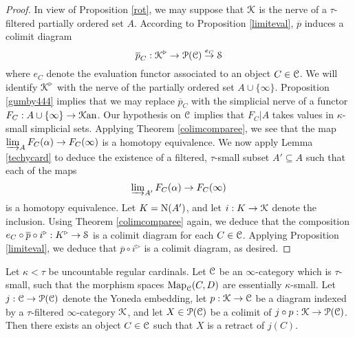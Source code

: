 \begin{proof}
In view of Proposition \ref{rot}, we may suppose that $\operatorname{\mathcal{K}}$ is the nerve of a $\tau$-filtered partially ordered set $A$. According to Proposition \ref{limiteval}, $\overline{p}$ induces a colimit diagram
$$ \overline{p}_{C}: \operatorname{\mathcal{K}}^{\triangleright} \rightarrow \operatorname{\mathcal{P}}(\operatorname{\mathcal{C}}) \stackrel{e_C}{\rightarrow} \operatorname{\mathcal{S}}$$
where $e_{C}$ denote the evaluation functor associated to an object $C \in \operatorname{\mathcal{C}}$. We will
identify $\operatorname{\mathcal{K}}^{\triangleright}$ with the nerve of the partially ordered set $A \cup \{\infty\}$. 
Proposition \ref{gumby444} implies that we may replace $\overline{p}_{C}$ with the simplicial nerve
of a functor $F_{C}: A \cup \{ \infty\} \rightarrow \operatorname{\mathcal{K}an}$. Our hypothesis on $\operatorname{\mathcal{C}}$ implies
that $F_{C}|A$ takes values in $\kappa$-small simplicial sets. Applying Theorem \ref{colimcomparee}, we see that the map $\operatorname{\varinjlim}_{A} F_{C}(\alpha) \rightarrow F_{C}(\infty)$ is a homotopy equivalence. We now apply Lemma \ref{techycard} to deduce the
existence of a filtered, $\tau$-small subset $A' \subseteq A$ such that each of the maps
$$ \operatorname{\varinjlim}_{A'} F_{C}(\alpha) \rightarrow F_{C}(\infty)$$ is a homotopy equivalence.
Let $K = \operatorname{N}(A')$, and let $i: K \rightarrow \operatorname{\mathcal{K}}$ denote the inclusion. Using Theorem \ref{colimcomparee} again, we deduce that the composition
$e_{C} \circ  \overline{p} \circ i^{\triangleright}: K^{\triangleright} \rightarrow \operatorname{\mathcal{S}}$ is a colimit diagram for each $C \in \operatorname{\mathcal{C}}$. Applying Proposition \ref{limiteval}, we deduce that
$\overline{p} \circ i^{\triangleright}$ is a colimit diagram, as desired.
\end{proof}

\begin{proposition}\label{stufenn}
Let $\kappa < \tau$ be uncountable regular cardinals. Let $\operatorname{\mathcal{C}}$ be an $\infty$-category which is $\tau$-small, such that the morphism spaces $\operatorname{{Map}}_{\operatorname{\mathcal{C}}}(C,D)$ are essentially $\kappa$-small.
Let $j: \operatorname{\mathcal{C}} \rightarrow \operatorname{\mathcal{P}}(\operatorname{\mathcal{C}})$ denote the Yoneda embedding, let
$p: \operatorname{\mathcal{K}} \rightarrow \operatorname{\mathcal{C}}$ be a diagram indexed by a $\tau$-filtered $\infty$-category
$\operatorname{\mathcal{K}}$, and let $X \in \operatorname{\mathcal{P}}(\operatorname{\mathcal{C}})$ be a colimit of $j \circ p: \operatorname{\mathcal{K}} \rightarrow \operatorname{\mathcal{P}}(\operatorname{\mathcal{C}})$. 
Then there exists an object $C \in \operatorname{\mathcal{C}}$ such that $X$ is a retract of $j(C)$.
\end{proposition}

